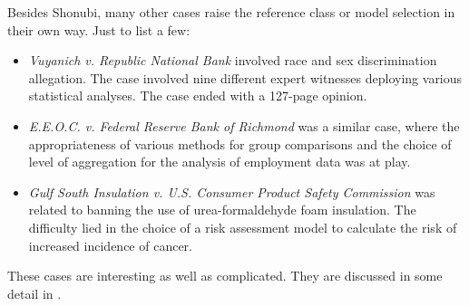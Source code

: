 \documentclass{article}
\begin{document}

Besides Shonubi, many other cases raise the reference class or model selection in their own way. Just to list a few:
\begin{itemize}
	\item \emph{Vuyanich v. Republic National Bank} involved race and sex discrimination allegation.  The case involved nine different  expert witnesses deploying various statistical analyses. The case ended with a 127-page opinion.
	\item \emph{E.E.O.C. v. Federal Reserve Bank of Richmond} was a similar case, where the appropriateness of various methods for group comparisons and the choice of level of aggregation for the analysis of employment data was at play.
	\item  \emph{Gulf South Insulation v. U.S. Consumer Product Safety Commission} was related to banning the use of urea-formaldehyde foam insulation. The difficulty lied in the  choice of a risk assessment model to calculate the risk of increased incidence of cancer.
\end{itemize}
These cases are interesting as well as complicated. They are discussed in some detail in \citep{fienberg1989evolving}. 










\end{document}
